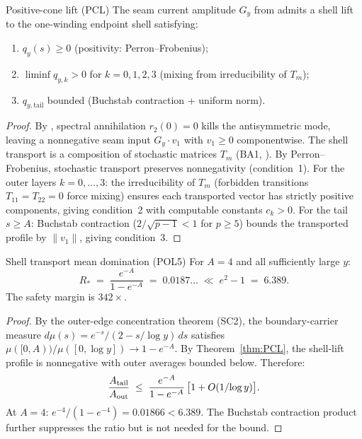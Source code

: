 \documentclass[12pt,a4paper]{article}
\begin{document}
\begin{thmbox}{Positive-cone lift (PCL)}
\label{thm:PCL}
The seam current amplitude $G_y$ from
\cite{companion_M3} admits a shell lift to the
one-winding endpoint shell satisfying:
\begin{enumerate}[nosep]
\item $q_y(s) \geq 0$ \textup{(positivity: Perron--Frobenius);}
\item $\liminf q_{y,k} > 0$ for $k = 0,1,2,3$
  \textup{(mixing from irreducibility of $T_m$);}
\item $q_{y,\text{tail}}$ bounded
  \textup{(Buchstab contraction + uniform norm).}
\end{enumerate}
\begin{proof}
By \cite{companion_M3}, spectral annihilation
$r_2(0) = 0$ kills the antisymmetric mode, leaving a nonnegative
seam input $G_y \cdot v_1$ with $v_1 \geq 0$ componentwise.
The shell transport is a composition of stochastic matrices $T_m$
(BA1, \cite{companion_M1}). By Perron--Frobenius, stochastic transport preserves
nonnegativity (condition~1).
For the outer layers $k = 0,\ldots,3$: the irreducibility of $T_m$
(forbidden transitions $T_{11} = T_{22} = 0$ force mixing) ensures
each transported vector has strictly positive components, giving
condition~2 with computable constants $c_k > 0$.
For the tail $s \geq A$: Buchstab contraction
($2/\!\sqrt{p-1} < 1$ for $p\geq 5$) bounds the transported
profile by $\|v_1\|$, giving condition~3.
\end{proof}
\end{thmbox}

\begin{thmbox}{Shell transport mean domination (POL5)}
\label{thm:POL5}
For $A = 4$ and all sufficiently large $y$:
\begin{equation}
  R_* \;=\; \frac{e^{-A}}{1 - e^{-A}}
  \;=\; 0.0187\ldots
  \;\ll\; e^2 - 1 \;=\; 6.389.
  \label{eq:POL5_ratio}
\end{equation}
The safety margin is $342\times$.
\begin{proof}
By the outer-edge concentration theorem (SC2), the boundary-carrier
measure $d\mu(s) = e^{-s}/(2 - s/\!\log y)\,ds$ satisfies
$\mu([0,A))/\mu([0,\log y]) \to 1 - e^{-A}$.
By Theorem~\ref{thm:PCL}, the shell-lift profile is nonnegative
with outer averages bounded below.  Therefore:
\[
  \frac{A_{\rm tail}}{A_{\rm out}}
  \;\leq\;
  \frac{e^{-A}}{1 - e^{-A}}\,\bigl[1 + O(1/\!\log y)\bigr].
\]
At $A = 4$: $e^{-4}/(1 - e^{-4}) = 0.01866 < 6.389$.
The Buchstab contraction product further suppresses the ratio
but is not needed for the bound.
\end{proof}
\end{thmbox}
\end{document}
